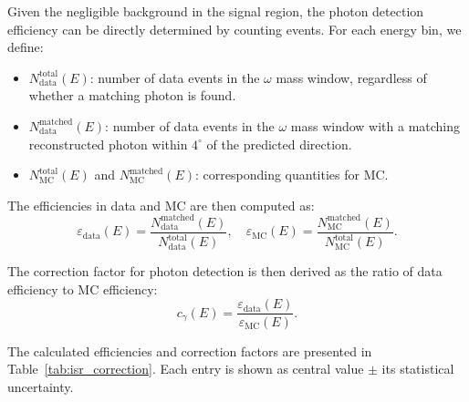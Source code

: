 Given the negligible background in the signal region, the photon detection efficiency can be directly determined by counting events. For each energy bin, we define:
\begin{itemize}
    \item $N_{\text{data}}^{\text{total}}(E)$: number of data events in the $\omega$ mass window, regardless of whether a matching photon is found.
    \item $N_{\text{data}}^{\text{matched}}(E)$: number of data events in the $\omega$ mass window with a matching reconstructed photon within $4^\circ$ of the predicted direction.
    \item $N_{\text{MC}}^{\text{total}}(E)$ and $N_{\text{MC}}^{\text{matched}}(E)$: corresponding quantities for MC.
\end{itemize}

The efficiencies in data and MC are then computed as:
\begin{equation}
    \varepsilon_{\text{data}}(E) = \frac{N_{\text{data}}^{\text{matched}}(E)}{N_{\text{data}}^{\text{total}}(E)}, \quad
    \varepsilon_{\text{MC}}(E) = \frac{N_{\text{MC}}^{\text{matched}}(E)}{N_{\text{MC}}^{\text{total}}(E)}.
    \label{eq:isr_efficiency}
\end{equation}

The correction factor for photon detection is then derived as the ratio of data efficiency to MC efficiency:
\begin{equation}
    c_{\gamma}(E) = \frac{\varepsilon_{\text{data}}(E)}{\varepsilon_{\text{MC}}(E)}.
    \label{eq:isr_correction}
\end{equation}

The calculated efficiencies and correction factors are presented in Table~\ref{tab:isr_correction}. Each entry is shown as central value $\pm$ its statistical uncertainty.

